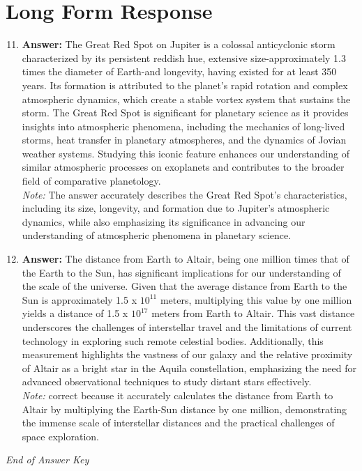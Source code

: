 \documentclass[12pt]{article}
\begin{document}
\section*{Long Form Response}
\begin{enumerate}[label=\arabic*.]
\setcounter{enumi}{10}
\item \textbf{Answer:} The Great Red Spot on Jupiter is a colossal anticyclonic storm characterized by its persistent reddish hue, extensive size-approximately 1.3 times the diameter of Earth-and longevity, having existed for at least 350 years. Its formation is attributed to the planet's rapid rotation and complex atmospheric dynamics, which create a stable vortex system that sustains the storm. The Great Red Spot is significant for planetary science as it provides insights into atmospheric phenomena, including the mechanics of long-lived storms, heat transfer in planetary atmospheres, and the dynamics of Jovian weather systems. Studying this iconic feature enhances our understanding of similar atmospheric processes on exoplanets and contributes to the broader field of comparative planetology.
\\ \textit{Note:} The answer accurately describes the Great Red Spot's characteristics, including its size, longevity, and formation due to Jupiter's atmospheric dynamics, while also emphasizing its significance in advancing our understanding of atmospheric phenomena in planetary science.
\item \textbf{Answer:} The distance from Earth to Altair, being one million times that of the Earth to the Sun, has significant implications for our understanding of the scale of the universe. Given that the average distance from Earth to the Sun is approximately 1.5 x $10^11$ meters, multiplying this value by one million yields a distance of 1.5 x $10^17$ meters from Earth to Altair. This vast distance underscores the challenges of interstellar travel and the limitations of current technology in exploring such remote celestial bodies. Additionally, this measurement highlights the vastness of our galaxy and the relative proximity of Altair as a bright star in the Aquila constellation, emphasizing the need for advanced observational techniques to study distant stars effectively.
\\ \textit{Note:} correct because it accurately calculates the distance from Earth to Altair by multiplying the Earth-Sun distance by one million, demonstrating the immense scale of interstellar distances and the practical challenges of space exploration.
\end{enumerate}

\vfill
\noindent\textit{End of Answer Key}
\end{document}
